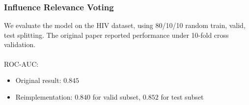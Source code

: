 \subsubsection{Influence Relevance Voting}

We evaluate the model on the HIV dataset, using 80/10/10 random train, valid, test splitting. The original paper reported performance under 10-fold cross validation.\cite{IRV}
~\\\\
ROC-AUC:
\begin{itemize}
    \item Original result: $0.845$
    \item Reimplementation: $0.840$ for valid subset, $0.852$ for test subset
\end{itemize}

%
%

%
